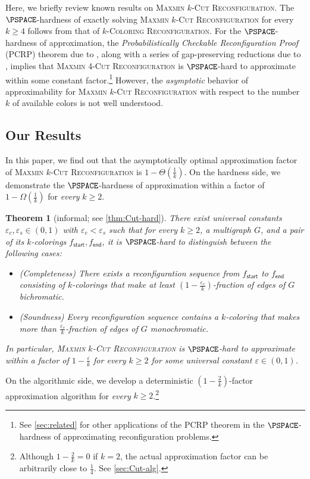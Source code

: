 \documentclass[11pt,fleqn]{article}
\renewcommand{\geq}{\geqslant}
\renewcommand{\epsilon}{\varepsilon}
\newcommand{\prb}[1]{\textsc{#1}\xspace}
\newcommand{\sss}{\mathsf{start}}
\newcommand{\ttt}{\mathsf{end}}
\newcommand{\f}{f}
\newcommand{\kColReconf}{\prb{$k$-Coloring Reconfiguration}}
\newcommand{\MMkCutReconf}{\prb{Maxmin $k$-Cut Reconfiguration}}
\newtheorem{theorem}{Theorem}[section]
\theoremstyle{definition}
\numberwithin{equation}{section}
\begin{document}
Here, we briefly review known results on \MMkCutReconf.
The $\PSPACE$-hardness of exactly solving \MMkCutReconf for every $k \geq 4$
follows from that of \kColReconf \cite{bonsma2009finding}.
For the $\PSPACE$-hardness of approximation,
the \emph{Probabilistically Checkable Reconfiguration Proof} (PCRP) theorem
due to \citet{hirahara2024probabilistically,karthik2023inapproximability},
along with a series of gap-preserving reductions due to \citet{ohsaka2023gap,bonsma2009finding},
implies that
\prb{Maxmin 4-Cut Reconfiguration} is $\PSPACE$-hard to approximate within some constant factor.\footnote{See \cref{sec:related} for other applications of the PCRP theorem in the $\PSPACE$-hardness of approximating reconfiguration problems.}
However, 
the \emph{asymptotic} behavior of approximability for \MMkCutReconf with respect to
the number $k$ of available colors is not well understood.


\subsection{Our Results}
In this paper, we find out that
the asymptotically optimal approximation factor of \MMkCutReconf is $1 - \Theta\left(\frac{1}{k}\right)$.
On the hardness side,
we demonstrate the $\PSPACE$-hardness of approximation
within a factor of $1-\Omega\left(\frac{1}{k}\right)$ for \emph{every} $k \geq 2$.


\begin{theorem}[informal; see \cref{thm:Cut-hard}]
\label{thm:intro:Cut-hard}
    There exist universal constants $\epsilon_c,\epsilon_s \in (0,1)$ with $\epsilon_c < \epsilon_s$ such that
    for every $k \geq 2$, a multigraph $G$, and a pair of its $k$-colorings $\f_\sss, \f_\ttt$,
    it is $\PSPACE$-hard to distinguish between the following cases\textup{:}
    \begin{itemize}
        \item \textup{(}Completeness\textup{)}
            There exists a reconfiguration sequence from $\f_\sss$ to $\f_\ttt$
            consisting of $k$-colorings that make at least
            $\left(1-\frac{\epsilon_c}{k}\right)$-fraction of edges of $G$ bichromatic.
        \item \textup{(}Soundness\textup{)}
            Every reconfiguration sequence contains a $k$-coloring that makes
            more than $\frac{\epsilon_s}{k}$-fraction of edges of $G$ monochromatic.
    \end{itemize}
    In particular,
    \MMkCutReconf is $\PSPACE$-hard to approximate within a factor of
    $1-\frac{\epsilon}{k}$ for every $k \geq 2$
    for some universal constant $\epsilon \in (0,1)$.
\end{theorem}\noindent
On the algorithmic side,
we develop a deterministic $\left(1-\frac{2}{k}\right)$-factor approximation algorithm for \emph{every} $k \geq 2$.\footnote{
Although $1-\frac{2}{k} = 0$ if $k=2$,
the actual approximation factor can be arbitrarily close to $\frac{1}{4}$.
See \cref{sec:Cut-alg}.
}
\end{document}
